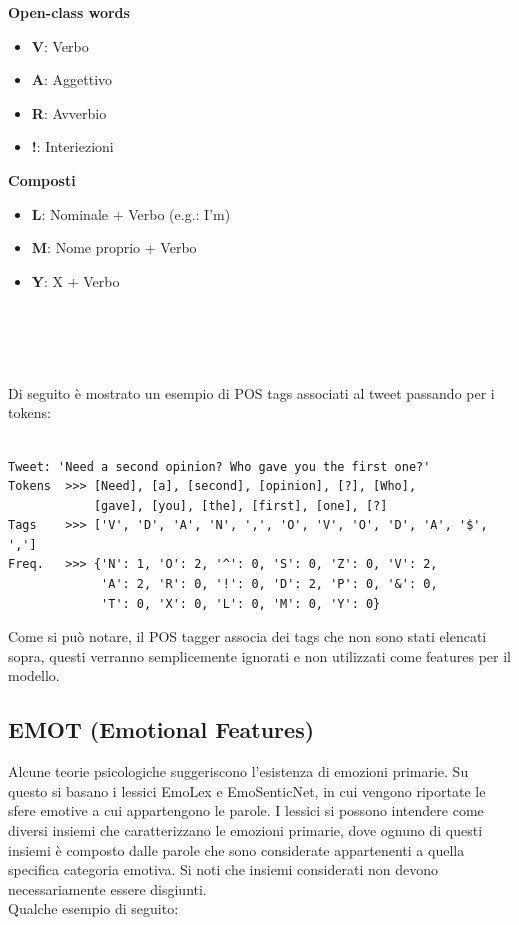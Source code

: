\documentclass[oneside]{book}
\begin{document}
\begin{varwidth}[t]{\textwidth}
	\textbf{Open-class words}
	\begin{itemize}
		\item \textbf{V}: Verbo
		\item \textbf{A}: Aggettivo
		\item \textbf{R}: Avverbio
		\item \textbf{!}: Interiezioni
	\end{itemize}
\end{varwidth}
\hspace{11em}
\begin{varwidth}[t]{\textwidth}
	\textbf{Composti}
	\begin{itemize}
		\item \textbf{L}: Nominale + Verbo (e.g.: I'm)
		\item \textbf{M}: Nome proprio + Verbo
		\item \textbf{Y}: X + Verbo
	\end{itemize}
\end{varwidth}\\\\\\\\
Di seguito è mostrato un esempio di POS tags associati al tweet passando per i tokens:


\begin{lstlisting}[caption={Esempio di tweet con POS tags associati.}]

Tweet: 'Need a second opinion? Who gave you the first one?'
Tokens  >>> [Need], [a], [second], [opinion], [?], [Who],
            [gave], [you], [the], [first], [one], [?]
Tags    >>> ['V', 'D', 'A', 'N', ',', 'O', 'V', 'O', 'D', 'A', '$', ',']
Freq.   >>> {'N': 1, 'O': 2, '^': 0, 'S': 0, 'Z': 0, 'V': 2,
             'A': 2, 'R': 0, '!': 0, 'D': 2, 'P': 0, '&': 0,
             'T': 0, 'X': 0, 'L': 0, 'M': 0, 'Y': 0}
\end{lstlisting}
Come si può notare, il POS tagger associa dei tags che non sono stati elencati sopra, questi verranno semplicemente ignorati e non utilizzati come features per il modello. 

\subsection{EMOT (Emotional Features)}
Alcune teorie psicologiche suggeriscono l'esistenza di emozioni primarie. Su questo si basano i lessici EmoLex e EmoSenticNet, in cui vengono riportate le sfere emotive a cui appartengono le parole.
I lessici si possono intendere come diversi insiemi che caratterizzano le emozioni primarie, dove ognuno di questi insiemi è composto dalle parole che sono considerate appartenenti a quella specifica categoria emotiva. Si noti che insiemi considerati non devono necessariamente essere disgiunti.\\
Qualche esempio di seguito:
\end{document}
